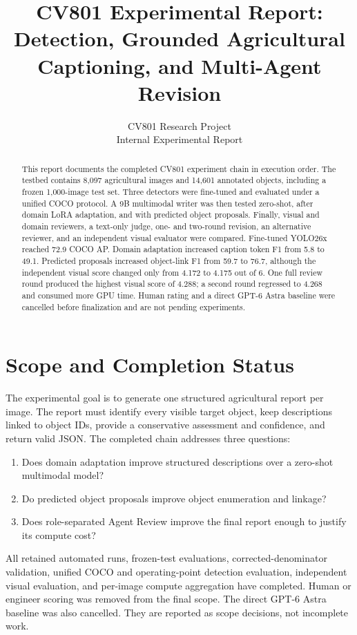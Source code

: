 \documentclass[11pt]{article}
\title{CV801 Experimental Report:\\
Detection, Grounded Agricultural Captioning, and Multi-Agent Revision}
\author{CV801 Research Project \\
Internal Experimental Report}
\begin{document}
\maketitle

\begin{abstract}
This report documents the completed CV801 experiment chain in execution order.
The testbed contains 8,097 agricultural images and 14,601 annotated objects,
including a frozen 1,000-image test set. Three detectors were fine-tuned and
evaluated under a unified COCO protocol. A 9B multimodal writer was then tested
zero-shot, after domain LoRA adaptation, and with predicted object proposals.
Finally, visual and domain reviewers, a text-only judge, one- and two-round
revision, an alternative reviewer, and an independent visual evaluator were
compared. Fine-tuned YOLO26x reached 72.9 COCO AP. Domain adaptation increased
caption token F1 from 5.8 to 49.1. Predicted proposals increased object-link F1
from 59.7 to 76.7, although the independent visual score changed only from
4.172 to 4.175 out of 6. One full review round produced the highest visual score
of 4.288; a second round regressed to 4.268 and consumed more GPU time. Human
rating and a direct GPT-6 Astra baseline were cancelled before finalization and
are not pending experiments.
\end{abstract}

\section{Scope and Completion Status}

The experimental goal is to generate one structured agricultural report per
image. The report must identify every visible target object, keep descriptions
linked to object IDs, provide a conservative assessment and confidence, and
return valid JSON. The completed chain addresses three questions:

\begin{enumerate}[leftmargin=*,nosep]
    \item Does domain adaptation improve structured descriptions over a
    zero-shot multimodal model?
    \item Do predicted object proposals improve object enumeration and linkage?
    \item Does role-separated Agent Review improve the final report enough to
    justify its compute cost?
\end{enumerate}

All retained automated runs, frozen-test evaluations, corrected-denominator
validation, unified COCO and operating-point detection evaluation, independent
visual evaluation, and per-image compute aggregation have completed. Human or
engineer scoring was removed from the final scope. The direct GPT-6 Astra
baseline was also cancelled. They are reported as scope decisions, not
incomplete work.
\end{document}
